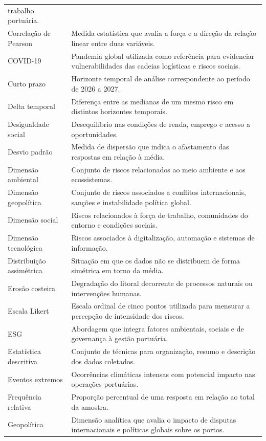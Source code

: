 \documentclass[
  portuguese,
  letterpaper,
  DIV=11,
  numbers=noendperiod]{scrreprt}
\begin{document}
\begin{longtable}[]{@{}
  >{\raggedright\arraybackslash}p{}
  >{\raggedright\arraybackslash}p{}@{}}
trabalho portuária. \\
Correlação de Pearson & Medida estatística que avalia a força e a
direção da relação linear entre duas variáveis. \\
COVID-19 & Pandemia global utilizada como referência para evidenciar
vulnerabilidades das cadeias logísticas e riscos sociais. \\
Curto prazo & Horizonte temporal de análise correspondente ao período de
2026 a 2027. \\
Delta temporal & Diferença entre as medianas de um mesmo risco em
distintos horizontes temporais. \\
Desigualdade social & Desequilíbrio nas condições de renda, emprego e
acesso a oportunidades. \\
Desvio padrão & Medida de dispersão que indica o afastamento das
respostas em relação à média. \\
Dimensão ambiental & Conjunto de riscos relacionados ao meio ambiente e
aos ecossistemas. \\
Dimensão geopolítica & Conjunto de riscos associados a conflitos
internacionais, sanções e instabilidade política global. \\
Dimensão social & Riscos relacionados à força de trabalho, comunidades
do entorno e condições sociais. \\
Dimensão tecnológica & Riscos associados à digitalização, automação e
sistemas de informação. \\
Distribuição assimétrica & Situação em que os dados não se distribuem de
forma simétrica em torno da média. \\
Erosão costeira & Degradação do litoral decorrente de processos naturais
ou intervenções humanas. \\
Escala Likert & Escala ordinal de cinco pontos utilizada para mensurar a
percepção de intensidade dos riscos. \\
ESG & Abordagem que integra fatores ambientais, sociais e de governança
à gestão portuária. \\
Estatística descritiva & Conjunto de técnicas para organização, resumo e
descrição dos dados coletados. \\
Eventos extremos & Ocorrências climáticas intensas com potencial impacto
nas operações portuárias. \\
Frequência relativa & Proporção percentual de uma resposta em relação ao
total da amostra. \\
Geopolítica & Dimensão analítica que avalia o impacto de disputas
internacionais e políticas globais sobre os portos. \\

\end{longtable}
\end{document}
